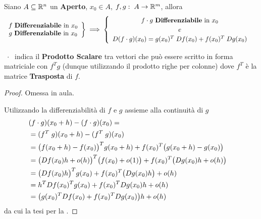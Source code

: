 \begin{proposition}
	\label{prop:diff_prod_scal}
	Siano $A \subseteq \mathbb{R}^n$ un \textbf{Aperto}, $x_0 \in A$, $f, g:\; A \to \mathbb{R}^m$, allora
	\[
		\left.
		\begin{array}{c}
			f \text{ \textbf{Differenziabile} in } x_0\\
			g \text{ \textbf{Differenziabile} in } x_0
		\end{array}
		\right\}
		\implies
		\begin{cases}
			\begin{array}{c}
				f \cdot g \text{ \textbf{Differenziabile} in } x_0\\
				e\\
				D(f \cdot g)(x_0) = g(x_0)^T \; Df(x_0) + f(x_0)^T \; Dg(x_0)
			\end{array}
		\end{cases}
	\]
	\vspace*{-\baselineskip}
	\begin{note}
		$\;\cdot\;$ indica il \textbf{Prodotto Scalare} tra vettori che può essere scritto in forma matriciale con $f^T g$ (dunque utilizzando il prodotto righe per colonne) dove $f^T$ è la matrice \textbf{Trasposta} di $f$.
	\end{note}
	\begin{proof}
		Omessa in aula.

		\cbstart
		\noindent Utilizzando la differenziabilità di $f$ e $g$ assieme alla continuità di $g$
		\begin{align*}
			\lefteqn{(f \cdot g)(x_0 + h) - (f \cdot g)(x_0) =}\\
			&= (f^T\;g)(x_0 + h) - (f^T\;g)(x_0)\\
			&= \bigl( f(x_0 + h) - f(x_0) \bigr)^T g(x_0 + h) + f(x_0)^T \bigl( g(x_0 + h) - g(x_0) \bigr)\\
			&= \bigl( Df(x_0)h + o(h) \bigr)^T \bigl( f(x_0) + o(1) \bigr) + f(x_0)^T \bigl( Dg(x_0)h + o(h) \bigr)\\
			&= \bigl( Df(x_0)h \bigr)^T g(x_0) + f(x_0)^T \bigl( Dg(x_0) h \bigr) + o(h)\\
			&= h^T Df(x_0)^T g(x_0) + f(x_0)^T Dg(x_0)h + o(h)\\
			&= \bigl( g(x_0)^T Df(x_0) + f(x_0)^T Dg(x_0) \bigr) h + o(h)
		\end{align*}
		da cui la tesi per la .
		\cbend
	\end{proof}
\end{proposition}
